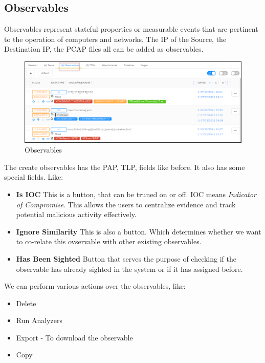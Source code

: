 \documentclass{book}
\begin{document}
\newpage


\subsection{Observables}
Observables represent stateful properties   or measurable events that are pertinent to the operation of computers and networks. The IP of the Source, the Destination IP, the PCAP files all can be added as observables. 

\begin{figure}[h]
    \centering
    \includegraphics[width=.8\linewidth]{Case_images/observables.png}
    \caption{Observables }
    \label{fig:observables}
\end{figure}

The create observables has the PAP, TLP, fields like before. It also has some special fields. Like:
\begin{itemize}
    \item \textbf{Is IOC} This is a button, that can be truned on or off. IOC means \textit{Indicator of Compromise}. This allows the users to centralize evidence and track potential malicious activity effectively.
    \item \textbf{Ignore Similarity} This is also a button. Which determines whether we want to co-relate this ovservable with other existing observables.
    \item \textbf{Has Been Sighted} Button that serves the purpose of checking if the observable has already sighted in the system or if it has assigned before. 
\end{itemize}
\bigskip
\bigskip
We can perform various actions over the observables, like:
\begin{itemize}
    \item Delete
    \item Run Analyzers
    \item Export - To download the observable 
    \item Copy 
\end{itemize}

\newpage
\end{document}
